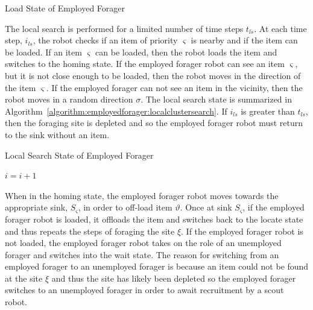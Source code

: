 \begin{algorithm}
\caption{Load State of Employed Forager}
\label{algorithm:loading}
\begin{algorithmic}[1]
	\State {}
\Else
\EndIf
\EndFunction
\end{algorithmic}
\end{algorithm}

The local search is performed for a limited number of time steps $t_{ls}$. At each time step, $i_{ls}$, the robot checks if an item of priority $\varsigma$ is nearby and if the item can be loaded. If an item $\varsigma$ can be loaded, then the robot loads the item and switches to the homing state. If the employed forager robot can see an item $\varsigma$, but it is not close enough to be loaded, then the robot moves in the direction of the item $\varsigma$. If the employed forager can not see an item in the vicinity, then the robot moves in a random direction $\sigma$. The local search state is summarized in Algorithm~\ref{algorithm:employedforager:localclustersearch}. If $i_{ls}$ is greater than $t_{ls}$, then the foraging site is depleted and so the employed forager robot must return to the sink without an item.

\begin{algorithm}
\caption{Local Search State of Employed Forager}
\label{algorithm:employedforager:localclustersearch}
\begin{algorithmic}[1]
			\State {}
			\State {}
			\State {}
		\Else
			\State {}
			\State {}	
		\EndIf
\Else
\EndIf
\State $i =i + 1$
\EndFunction
\end{algorithmic}
\end{algorithm}

When in the homing state, the employed forager robot moves towards the appropriate sink, $S_\varsigma$, in order to off-load item $\vartheta$. Once at sink $S_\varsigma$, if the employed forager robot is loaded, it offloads the item and switches back to the locate state and thus repeats the steps of foraging the site $\xi$. If the employed forager robot is not loaded, the employed forager robot takes on the role of an unemployed forager and switches into the wait state. The reason for switching from an employed forager to an unemployed forager is because an item could not be found at the site $\xi$ and thus the site has likely been depleted so the employed forager switches to an unemployed forager in order to await recruitment by a scout robot.

